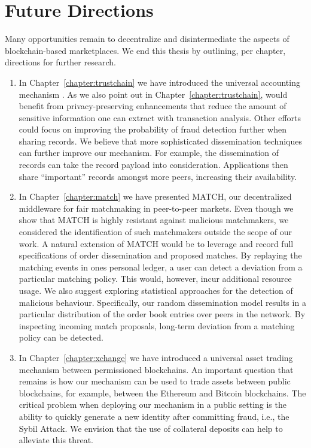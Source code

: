 \section{Future Directions}
Many opportunities remain to decentralize and disintermediate the aspects of blockchain-based marketplaces.
We end this thesis by outlining, per chapter, directions for further research.

\begin{enumerate}
	\item In Chapter~\ref{chapter:trustchain} we have introduced the universal accounting mechanism \TrustChain{}.
	As we also point out in Chapter~\ref{chapter:trustchain}, \TrustChain{} would benefit from privacy-preserving enhancements that reduce the amount of sensitive information one can extract with transaction analysis.
	Other efforts could focus on improving the probability of fraud detection further when sharing records.
	We believe that more sophisticated dissemination techniques can further improve our mechanism.
	For example, the dissemination of records can take the record payload into consideration.
	Applications then share \enquote{important} records amongst more peers, increasing their availability.
	
	\item In Chapter~\ref{chapter:match} we have presented MATCH, our decentralized middleware for fair matchmaking in peer-to-peer markets.
	Even though we show that MATCH is highly resistant against malicious matchmakers, we considered the identification of such matchmakers outside the scope of our work.
	A natural extension of MATCH would be to leverage \TrustChain{} and record full specifications of order dissemination and proposed matches.
	By replaying the matching events in ones personal ledger, a user can detect a deviation from a particular matching policy.
	This would, however, incur additional resource usage.
	We also suggest exploring statistical approaches for the detection of malicious behaviour.
	Specifically, our random dissemination model results in a particular distribution of the order book entries over peers in the network.
	By inspecting incoming match proposals, long-term deviation from a matching policy can be detected.
	
	\item In Chapter~\ref{chapter:xchange} we have introduced a universal asset trading mechanism between permissioned blockchains.
	An important question that remains is how our mechanism can be used to trade assets between public blockchains, for example, between the Ethereum and Bitcoin blockchains.
	The critical problem when deploying our mechanism in a public setting is the ability to quickly generate a new identity after committing fraud, i.e., the Sybil Attack.
	We envision that the use of collateral deposits can help to alleviate this threat.
	

\end{enumerate}
